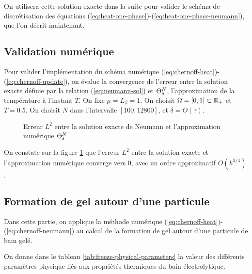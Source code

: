 On utilisera cette solution exacte dans la suite pour valider le schéma de
discrétisation des équations
(\ref{eq:heat-one-phase})-(\ref{eq:heat-one-phase-neumann}), que l'on
décrit maintenant.

\subsection*{Validation numérique}
Pour valider l'implémentation du schéma numérique
(\ref{eq:chernoff-heat})-(\ref{eq:chernoff-update}), on évalue la
convergence de l'erreur entre la solution exacte définie par la
relation (\ref{eq:neumann-sol}) et $\Theta^N_\delta$,
l'approximation de la température à l'instant $T$. On fixe $\mu =
L_\beta = 1$. On choisit $\Omega = [0, 1] \subset \mathbb R_+$ et $T =
0.5$. On choisit $N$ dans l'intervalle $[100, 12800]$, et $\delta =
O(\tau)$.

\begin{figure}
  \begin{center}
    
    \caption{Erreur $L^2$ entre la solution exacte de Neumann et
      l'approximation numérique $\Theta^N_\delta$}
    \label{fig:neumann-convergence}
  \end{center}
\end{figure}

On constate sur la figure \ref{fig:neumann-convergence} que l'erreur
$L^2$ entre la solution exacte et l'approximation numérique converge
vers 0, avec un ordre approximatif $O(h^{3/4})$.




\subsection*{Formation de gel autour d'une particule}
Dans cette partie, on applique la méthode numérique
(\ref{eq:chernoff-heat})-(\ref{eq:chernoff-neumann}) au calcul de
la formation de gel autour d'une particule de bain gelé.

On donne dans le tableau \ref{tab:freeze-physical-parameters} la
valeur des différents paramètres physique liés aux propriétés
thermiques du bain électrolytique.

